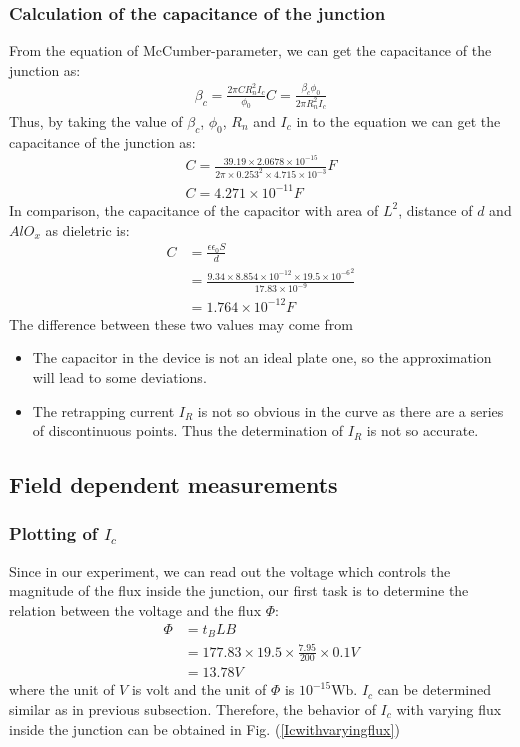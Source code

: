 \subsubsection{Calculation of the capacitance of the junction}
From the equation of McCumber-parameter, we can get the capacitance of the junction as:
\begin{align*}
    \beta_c=\frac{2\pi{C}{R_{n}^2}I_{c}}{\phi_{0}}
    C=\frac{\beta_c\phi_{0}}{2\pi{R_{n}^2}I_{c}}
\end{align*}
Thus, by taking the value of $\beta_{c}$, $\phi_{0}$, $R_{n}$ and $I_{c}$ in to the equation we can get the capacitance of the junction as:
\begin{align*}
    C=\frac{39.19\times2.0678\times10^{-15}}{2\pi\times0.253^2\times4.715\times10^{-3}}F\\
    C=4.271\times10^{-11}F
\end{align*}
In comparison, the capacitance of the capacitor with area of $L^2$, distance of $d$ and $AlO_{x}$ as dieletric is:
\begin{align*}
    C & =\frac{\epsilon\epsilon_{0}S}{d}\\
    & =\frac{9.34\times8.854\times10^{-12}\times{19.5\times10^{-6}}^2}{17.83\times10^{-9}}\\
    & =1.764\times10^{-12}F
\end{align*}
The difference between these two values may come from
\begin{itemize}
    \item The capacitor in the device is not an ideal plate one, so the approximation will lead to some deviations.
    \item The retrapping current $I_R$ is not so obvious in the curve as there are a series of discontinuous points. Thus the determination of $I_R$ is not so accurate.

\end{itemize}
\subsection{Field dependent measurements}
\subsubsection{Plotting of $I_{c}$}

Since in our experiment, we can read out the voltage which controls
the magnitude of the flux inside the junction, our first task is to
determine the relation between the voltage and the flux $\Phi$:
\begin{align*}
\Phi & =t_{B}LB\\
 & =177.83\times19.5\times\frac{7.95}{200}\times0.1V\\
 & =13.78V
\end{align*}
where the unit of $V$ is volt and the unit of $\Phi$ is $10^{-15}\mathrm{Wb}$.
$I_{c}$ can be determined similar as in previous subsection. Therefore,
the behavior of $I_{c}$ with varying flux inside the junction can
be obtained in Fig. (\ref{Icwithvaryingflux})

